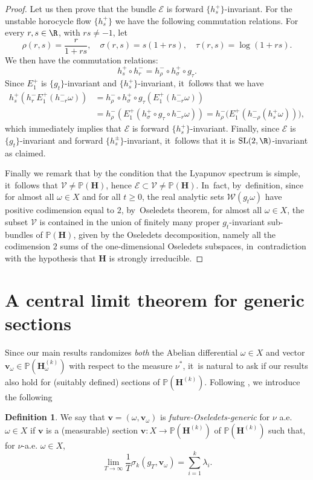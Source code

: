 \documentclass[JEP,XML,SOM,Unicode,published]{cedram}
\theoremstyle{plain}
\theoremstyle{definition}
\newtheorem{definition}[thm]{Definition}
\numberwithin{equation}{subsection}
\newcommand\bP{\mathbb{P}}
\newcommand\cE{\mathcal{E}}
\newcommand\cV{\mathcal{V}}
\newcommand\cW{\mathcal{W}}
\newcommand{\SL}{\mathrm{SL}}
\newcommand{\bfH}{\boldsymbol{H}}
\newcommand{\bfv}{\boldsymbol{v}}
\begin{document}
\begin{proof}
Let us then prove that the bundle $\cE$ is forward $\{h^+_s\}$-invariant. For the unstable horocycle flow $\{h^+_s\}$ we have the following commutation relations. For every $r, s \in \R$, with $rs\not=-1$, let
\[
\rho(r,s) = \frac{r}{1+rs}, \quad \sigma(r,s) = s(1+rs), \quad \tau(r,s)= \log (1+rs).
\]
We then have the commutation relations:
\[
h^+_s \circ h^-_{r} = h^-_\rho \circ h^+_\sigma \circ g_\tau.
\]
Since $E^+_1$ is $\{g_t\}$-invariant and $\{h^+_s\}$-invariant, it~follows that we have
\[
\begin{aligned}
h^+_s \left(h^-_r E^+_1(h^-_{-r} \omega)\right) & = h^-_\rho \circ h^+_\sigma \circ g_\tau \left(E^+_1(h^-_{-r} \omega)\right) \\ & =
h^-_\rho \left(E^+_1(h^+_\sigma \circ g_\tau \circ h^-_{-r} \omega)\right)
= h^-_\rho \bigl(E^+_1(h^-_{-\rho} (h^+_s \omega)) \bigr),
\end{aligned}
\]
which immediately implies that $\cE$ is
forward $\{h^+_s\}$-invariant. Finally, since
$\cE$ is $\{g_t\}$-invariant and forward
$\{h^\pm_s\}$-invariant, it~follows that it is
$\SL(2, \R)$-invariant as claimed.

Finally we remark that by the condition that the Lyapunov spectrum is simple, it~follows that $\cV \not =\bP(\bfH)$, hence $\cE \subset \cV \not = \bP(\bfH)$. In~fact, by~definition, since for almost all $\omega \in X$ and for all $t \geq 0$, the real analytic sets $\cW (g_t \omega)$ have positive codimension equal to $2$, by~Oseledets theorem, for almost all $\omega \in X$, the subset $\cV$ is contained in the union of finitely many proper $g_t$-invariant sub-bundles of $\bP ({\bfH})$, given by the Oseledets decomposition, namely all the codimension $2$ sums of the one-dimensional Oseledets subspaces, in~contradiction with the hypothesis that $\bfH$ is strongly irreducible.
\end{proof}

\section{A central limit theorem for generic sections}\label{sectionsclt}
Since our main results randomizes \emph{both} the Abelian differential $\omega\in X$ and vector $\bfv_\omega\in
\bP(\bfH_\omega^{(k)})$ with respect to the measure $\nu^*$, it~is natural to ask if our results also hold for (suitably defined) sections of $\bP(\bfH^{(k)})$. Following \cite{AF24}, we introduce the following

\begin{definition}\label{fut-gen}
We say that $\bfv=(\omega,\bfv_{\omega})$ is \emph{future-Oseledets-generic} for $\nu$ a.e. $\omega\in X$ if $\bfv$ is a (measurable) section $\bfv:X \to \bP(\bfH^{(k)})$ of $\bP(\bfH^{(k)})$ such that, for $\nu$-a.e. $\omega \in X$,
\[
\lim_{T\to\infty} \frac{1}{T} \sigma_k(g_{T}, \bfv_\omega) = \sum_{i=1}^k \lambda_i.
\]
\end{definition}
\end{document}

